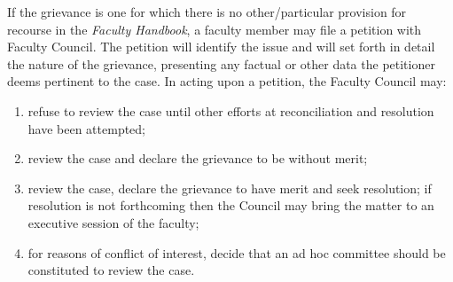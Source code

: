 		If the grievance is one for which there is no other/particular
		provision for recourse in the \emph{Faculty Handbook}, a faculty
		member may file a petition with Faculty Council.  The petition will
		identify the issue and will set forth in detail the nature of the
		grievance, presenting any factual or other data the petitioner deems
		pertinent to the case.  In acting upon a petition, the Faculty
		Council may:

		\begin{enumerate}[label=\alph*)]
			\item{refuse to review the case until other efforts at reconciliation and resolution have been attempted;
			}
			\item{review the case and declare the grievance to be without merit;
			}
			\item{review the case, declare the grievance to have merit and seek resolution; if resolution is not forthcoming then the Council may bring the matter to an executive session of the faculty;
			}
			\item{for reasons of conflict of interest, decide that an ad hoc committee should be constituted to review the case.
			}
		\end{enumerate}

